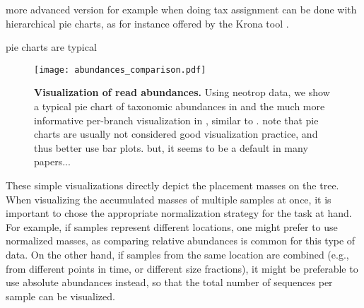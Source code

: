 more advanced version for example when doing tax assignment can be done with hierarchical pie charts,
as for instance offered by the Krona tool \cite{Ondov2011}.

pie charts are typical \cite{Huttenhower2012}

\begin{figure}[!ht]
    \centering
    \texttt{[image: abundances\_comparison.pdf]}
    \begin{subfigure}{0pt}
        \label{fig:abundances_comparison:sub:pie_chart}
    \end{subfigure}
    \begin{subfigure}{0pt}
        \label{fig:abundances_comparison:sub:branch_colors}
    \end{subfigure}
    \caption[Visualization of read abundances]{
        \textbf{Visualization of read abundances.}
        Using neotrop data, we show a typical pie chart of taxonomic abundances in
        and the much more informative per-branch visualization in
        ,
        similar to \cite{Mahe2017}.
        note that pie charts are usually not considered good visualization practice,
        and thus better use bar plots. but, it seems to be a default in many papers...
    }
    \label{fig:abundances_comparison}
\end{figure}

These simple visualizations directly depict the placement masses on the tree.
When visualizing the accumulated masses of multiple samples at once,
it is important to chose the appropriate normalization strategy for the task at hand.
For example, if samples represent different locations, one might prefer to use normalized masses,
as comparing relative abundances is common for this type of data.
On the other hand, if samples from the same location are combined
(e.g., from different points in time, or different size fractions),
it might be preferable to use absolute abundances instead,
so that the total number of sequences per sample can be visualized.

